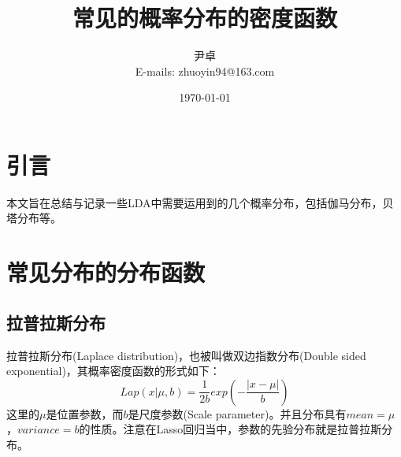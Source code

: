 \documentclass[UTF8, 12pt]{ctexart}
\begin{document}
\title{\heiti 常见的概率分布的密度函数}
\author{\kaishu 尹卓\\ E-mails: zhuoyin94@163.com}
\date{\today}
\maketitle

\tableofcontents
\newpage
\section{引言}
本文旨在总结与记录一些LDA中需要运用到的几个概率分布，包括伽马分布，贝塔分布等。

\section{常见分布的分布函数}

\subsection{拉普拉斯分布}
	拉普拉斯分布(Laplace distribution)，也被叫做双边指数分布(Double sided exponential)，其概率密度函数的形式如下：
	\begin{equation}
		Lap(x|\mu, b) = \frac{1}{2b} exp(-\frac{|x-\mu|}{b})
	\end{equation}
	这里的$\mu$是位置参数，而$b$是尺度参数(Scale parameter)。并且分布具有$mean=\mu$，$variance=b$的性质。注意在Lasso回归当中，参数的先验分布就是拉普拉斯分布。
\end{document}
